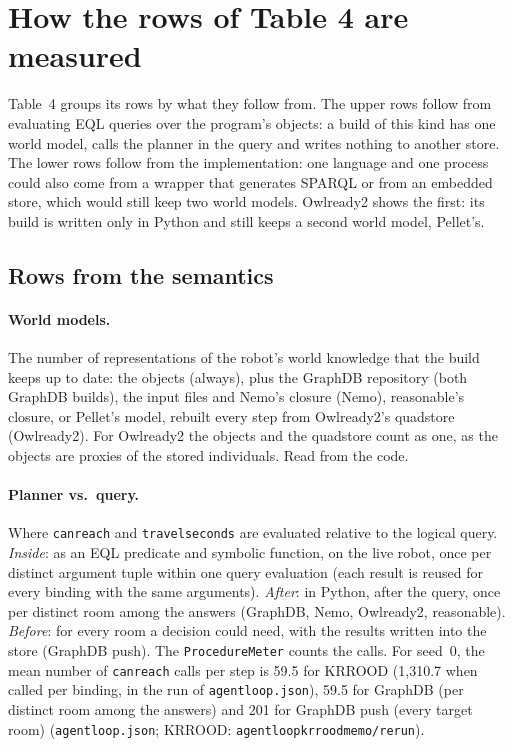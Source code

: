 \documentclass[10pt]{article}
\newcommand{\brkunderscore}{\textunderscore\allowbreak}
\newcommand{\code}[1]{{\let\_\brkunderscore\texttt{#1}}}
\newcommand{\file}[1]{{\let\_\brkunderscore\texttt{#1}}}
\begin{document}
\section{How the rows of Table 4 are measured}
\label{sec:measure}

Table~4 groups its rows by what they follow from. The upper rows follow from evaluating EQL queries over the program's
objects: a build of this kind has one world model, calls the planner in the query and writes nothing to another store.
The lower rows follow from the implementation: one language and one process could also come from a wrapper that
generates SPARQL or from an embedded store, which would still keep two world models. Owlready2 shows the first: its
build is written only in Python and still keeps a second world model, Pellet's.

\subsection{Rows from the semantics}

\paragraph{World models.} The number of representations of the robot's world knowledge that the build keeps up to date:
the objects (always), plus the GraphDB repository (both GraphDB builds), the input files and Nemo's closure (Nemo),
reasonable's closure, or Pellet's model, rebuilt every step from Owlready2's quadstore (Owlready2). For Owlready2 the
objects and the quadstore count as one, as the objects are proxies of the stored individuals. Read from the code.

\paragraph{Planner vs.\ query.} Where \code{can\_reach} and \code{travel\_seconds} are evaluated relative to the logical
query. \emph{Inside}: as an EQL predicate and symbolic function, on the live robot, once per distinct argument tuple within one query evaluation (each result is reused for every binding with the same arguments). \emph{After}: in Python,
after the query, once per distinct room among the answers (GraphDB, Nemo, Owlready2, reasonable). \emph{Before}: for every
room a decision could need, with the results written into the store (GraphDB push). The \code{ProcedureMeter} counts the
calls. For seed~0, the mean number of \code{can\_reach} calls per step is 59.5 for KRROOD (1,310.7 when called per binding, in the run of \file{agent\_loop.json}), 59.5 for
GraphDB (per distinct room among the answers) and 201 for GraphDB push (every target room)
(\file{agent\_loop.json}; KRROOD: \file{agent\_loop\_krrood\_memo/rerun}).
\end{document}
